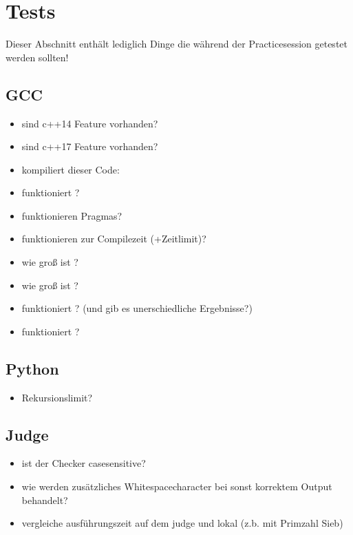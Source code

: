 \section{Tests}
Dieser Abschnitt enthält lediglich Dinge die während der Practicesession getestet werden sollten!

\subsection{GCC}
\begin{itemize}
	\item sind c++14 Feature vorhanden?
	\item sind c++17 Feature vorhanden?
	\item kompiliert dieser Code:
\end{itemize}
\begin{itemize}
	\item funktioniert ?
	\item funktionieren Pragmas?
	\item funktionieren  zur Compilezeit (+Zeitlimit)?
	\item wie groß ist ?
	\item wie groß ist ?
	\item funktioniert ? (und gib es unerschiedliche Ergebnisse?)
	\item funktioniert ?
\end{itemize}

\subsection{Python}
\begin{itemize}
	\item Rekursionslimit?
\end{itemize}

\subsection{Judge}
\begin{itemize}
	\item ist der Checker casesensitive?
	\item wie werden zusätzliches Whitespacecharacter bei sonst korrektem Output behandelt?
	\item vergleiche ausführungszeit auf dem judge und lokal (z.b. mit Primzahl Sieb)
\end{itemize}

